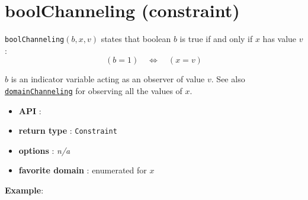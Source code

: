 \label{boolchanneling}
\hypertarget{boolchanneling}{}

\section{boolChanneling (constraint)}\label{boolchanneling:boolchannelingconstraint}\hypertarget{boolchanneling:boolchannelingconstraint}{}
\begin{notedef}  
\texttt{boolChanneling}$(b,x,v)$ states that boolean $b$ is true if and only if $x$ has value $v$:
$$(b=1)\quad\iff\quad (x=v)$$ 
\end{notedef}

$b$ is an indicator variable acting as an observer of value $v$. 
See also \hyperlink{domainchanneling}{\texttt{domainChanneling}} for observing all the values of $x$.
\begin{itemize}
	\item \textbf{API} : 
	\item \textbf{return type} : \texttt{Constraint}
	\item \textbf{options} : \emph{n/a}
	\item \textbf{favorite domain} : enumerated for $x$
\end{itemize}

\textbf{Example}:

